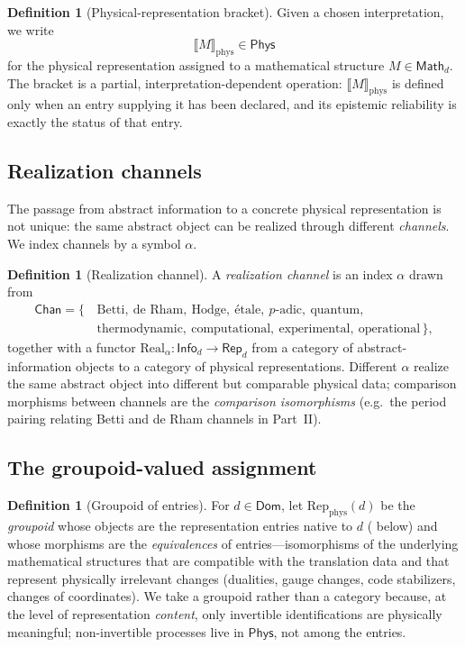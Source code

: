 \documentclass[12pt]{article}
\theoremstyle{definition}
\newtheorem{definition}[theorem]{Definition}
\theoremstyle{remark}
\newcommand{\Dom}{\mathsf{Dom}}
\newcommand{\Math}{\mathsf{Math}}
\newcommand{\Phys}{\mathsf{Phys}}
\newcommand{\Info}{\mathsf{Info}}
\newcommand{\Rep}{\mathsf{Rep}}
\newcommand{\Real}{\mathrm{Real}}
\newcommand{\Repphys}{\mathrm{Rep}_{\mathrm{phys}}}
\newcommand{\physrep}[1]{\llbracket #1 \rrbracket_{\mathrm{phys}}}
\begin{document}
\begin{definition}[Physical-representation bracket]
\label{def:bracket}
Given a chosen interpretation, we write
\[
  \physrep{M} \in \Phys
\]
for the physical representation assigned to a mathematical structure
$M \in \Math_d$. The bracket is a partial, interpretation-dependent operation:
$\physrep{M}$ is defined only when an entry supplying it has been declared, and
its epistemic reliability is exactly the status of that entry.
\end{definition}

\subsection{Realization channels}

The passage from abstract information to a concrete physical representation is
not unique: the same abstract object can be realized through different
\emph{channels}. We index channels by a symbol $\alpha$.

\begin{definition}[Realization channel]
\label{def:channel}
A \emph{realization channel} is an index $\alpha$ drawn from
\[
\begin{aligned}
  \mathsf{Chan} = \{\,&\text{Betti},\ \text{de Rham},\ \text{Hodge},\ \text{\'etale},\ p\text{-adic},\ \text{quantum},\\
  &\text{thermodynamic},\ \text{computational},\ \text{experimental},\ \text{operational}\,\},
\end{aligned}
\]
together with a functor $\Real_\alpha : \Info_d \to \Rep_d$ from a category of
abstract-information objects to a category of physical representations. Different
$\alpha$ realize the same abstract object into different but comparable physical
data; comparison morphisms between channels are the \emph{comparison isomorphisms}
(e.g.\ the period pairing relating Betti and de Rham channels in Part~II).
\end{definition}

\subsection{The groupoid-valued assignment}

\begin{definition}[Groupoid of entries]
\label{def:gpd-entries}
For $d \in \Dom$, let $\Repphys(d)$ be the \emph{groupoid} whose objects are the
representation entries native to $d$ ( below) and whose morphisms
are the \emph{equivalences} of entries---isomorphisms of the underlying
mathematical structures that are compatible with the translation data and that
represent physically irrelevant changes (dualities, gauge changes, code
stabilizers, changes of coordinates). We take a groupoid rather than a category
because, at the level of representation \emph{content}, only invertible identifications
are physically meaningful; non-invertible processes live in $\Phys$, not among
the entries.
\end{definition}
\end{document}
